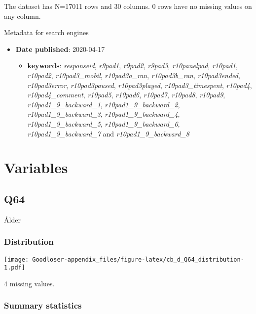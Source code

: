 \documentclass[
]{book}
\providecommand{\tightlist}{%
  \setlength{\itemsep}{0pt}\setlength{\parskip}{0pt}}
\begin{document}
The dataset has N=17011 rows and 30 columns.
0 rows have no missing values on any column.

Metadata for search engines

\begin{itemize}
\item
  \textbf{Date published}: 2020-04-17

  \begin{itemize}
  \tightlist
  \item
    \textbf{keywords}: \emph{responseid}, \emph{r9pad1}, \emph{r9pad2}, \emph{r9pad3}, \emph{r10panelpad}, \emph{r10pad1}, \emph{r10pad2}, \emph{r10pad3\_mobil}, \emph{r10pad3a\_ran}, \emph{r10pad3b\_ran}, \emph{r10pad3ended}, \emph{r10pad3error}, \emph{r10pad3paused}, \emph{r10pad3played}, \emph{r10pad3\_timespent}, \emph{r10pad4}, \emph{r10pad4\_comment}, \emph{r10pad5}, \emph{r10pad6}, \emph{r10pad7}, \emph{r10pad8}, \emph{r10pad9}, \emph{r10pad1\_9\_backward\_1}, \emph{r10pad1\_9\_backward\_2}, \emph{r10pad1\_9\_backward\_3}, \emph{r10pad1\_9\_backward\_4}, \emph{r10pad1\_9\_backward\_5}, \emph{r10pad1\_9\_backward\_6}, \emph{r10pad1\_9\_backward\_7} and \emph{r10pad1\_9\_backward\_8}
  \end{itemize}
\end{itemize}

\hypertarget{variables-2}{%
\section{Variables}\label{variables-2}}

\hypertarget{Q64}{%
\subsection{Q64}\label{Q64}}

Ålder

\hypertarget{Q64_distribution}{%
\subsubsection{Distribution}\label{Q64_distribution}}

\texttt{[image: Goodloser-appendix\_files/figure-latex/cb\_d\_Q64\_distribution-1.pdf]}

4 missing values.

\hypertarget{Q64_summary}{%
\subsubsection{Summary statistics}\label{Q64_summary}}
\end{document}
